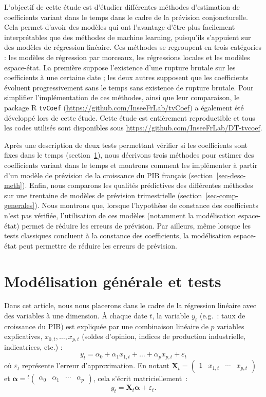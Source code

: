 \documentclass[
  a4paper,
  DIV=11,
  numbers=noendperiod,
  french]{scrartcl}
\newcommand\1{{\mathds 1}}
\newcommand{\transp}[1]{{}^t\!#1}
\newcommand{\bf}[1]{{\boldsymbol #1}}
\theoremstyle{remark}
\begin{document}
L'objectif de cette étude est d'étudier différentes méthodes
d'estimation de coefficients variant dans le temps dans le cadre de la
prévision conjoncturelle. Cela permet d'avoir des modèles qui ont
l'avantage d'être plus facilement interprétables que des méthodes de
machine learning, puisqu'ils s'appuient sur des modèles de régression
linéaire. Ces méthodes se regroupent en trois catégories : les modèles
de régression par morceaux, les régressions locales et les modèles
espace-état. La première suppose l'existence d'une rupture brutale sur
les coefficients à une certaine date ; les deux autres supposent que les
coefficients évoluent progressivement sans le temps sans existence de
rupture brutale. Pour simplifier l'implémentation de ces méthodes, ainsi
que leur comparaison, le package R \texttt{tvCoef}
(\url{https://github.com/InseeFrLab/tvCoef}) a également été développé
lors de cette étude. Cette étude est entièrement reproductible et tous
les codes utilisés sont disponibles sous
\url{https://github.com/InseeFrLab/DT-tvcoef}.

Après une description de deux tests permettant vérifier si les
coefficients sont fixes dans le temps (section~\ref{sec-tests}), nous
décrivons trois méthodes pour estimer des coefficients variant dans le
temps et montrons comment les implémenter à partir d'un modèle de
prévision de la croissance du PIB français
(section~\ref{sec-desc-meth}). Enfin, nous comparons les qualités
prédictives des différentes méthodes sur une trentaine de modèles de
prévision trimestrielle (section~\ref{sec-comp-generales}). Nous
montrons que, lorsque l'hypothèse de constance des coefficients n'est
pas vérifiée, l'utilisation de ces modèles (notamment la modélisation
espace-état) permet de réduire les erreurs de prévision. Par ailleurs,
même lorsque les tests classiques concluent à la constance des
coefficients, la modélisation espace-état peut permettre de réduire les
erreurs de prévision.

\section{Modélisation générale et tests}\label{sec-tests}

Dans cet article, nous nous placerons dans le cadre de la régression
linéaire avec des variables à une dimension. À chaque date \(t\), la
variable \(y_t\) (e.g.~: taux de croissance du PIB) est expliquée par
une combinaison linéaire de \(p\) variables explicatives,
\(x_{0,t},\dots,x_{p,t}\) (soldes d'opinion, indices de production
industrielle, indicatrices, etc.) : \[
y_t=\alpha_{0}+\alpha_{1} x_{1,t}+\dots+\alpha_{p} x_{p,t} +\varepsilon_t 
\] où \(\varepsilon_t\) représente l'erreur d'approximation. En notant
\({\bf X}_t=\begin{pmatrix}1 & x_{1,t} &\cdots & x_{p,t} \end{pmatrix}\)
et
\({\bf \alpha}=\transp{\begin{pmatrix}\alpha_0 & \alpha_1 &\cdots & \alpha_p \end{pmatrix}}\),
cela s'écrit matriciellement~: \[
y_t={\bf X_t} \bf\alpha +\varepsilon_t.
\]
\end{document}
